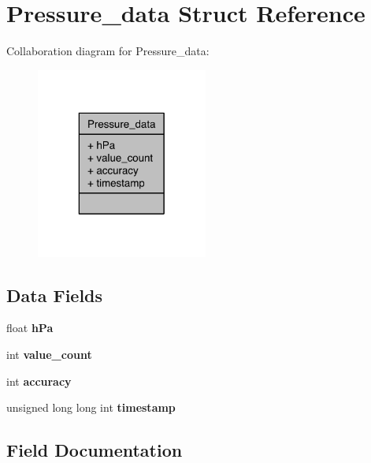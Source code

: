 \section{Pressure\-\_\-data Struct Reference}
\label{structPressure__data}


Collaboration diagram for Pressure\-\_\-data\-:\nopagebreak
\begin{figure}[H]
\begin{center}
\leavevmode
\includegraphics[width=160pt]{structPressure__data__coll__graph}
\end{center}
\end{figure}
\subsection*{Data Fields}
\begin{DoxyCompactItemize}
\item 
float {\bfseries h\-Pa}\label{structPressure__data_a3b980871bf6340daf2d52a7e3b489703}

\item 
int {\bfseries value\-\_\-count}\label{structPressure__data_aab72590dac2834f3c8498fe29664fc08}

\item 
int {\bfseries accuracy}\label{structPressure__data_ab09a469b916fd17577743502bcc376e4}

\item 
unsigned long long int {\bfseries timestamp}\label{structPressure__data_ad7c0915ab937f53948957ce2f04bf156}

\end{DoxyCompactItemize}


\subsection{Field Documentation}
